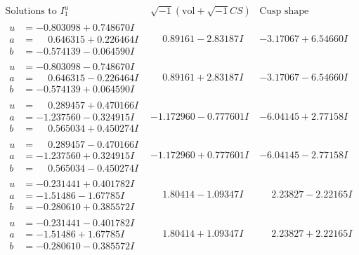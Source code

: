 \documentclass[1p]{elsarticle_modified}
\theoremstyle{definition}
\newcommand{\I}{\sqrt{-1}}
\begin{document}
$$\begin{array}{c|c|c}  
\text{Solutions to }I^u_{1}& \I (\text{vol} + \sqrt{-1}CS) & \text{Cusp shape}\\
 \hline 
\begin{aligned}
u &= -0.803098 + 0.748670 I \\
a &= \phantom{-}0.646315 + 0.226464 I \\
b &= -0.574139 - 0.064590 I\end{aligned}
 & \phantom{-}0.89161 - 2.83187 I & -3.17067 + 6.54660 I \\ \hline\begin{aligned}
u &= -0.803098 - 0.748670 I \\
a &= \phantom{-}0.646315 - 0.226464 I \\
b &= -0.574139 + 0.064590 I\end{aligned}
 & \phantom{-}0.89161 + 2.83187 I & -3.17067 - 6.54660 I \\ \hline\begin{aligned}
u &= \phantom{-}0.289457 + 0.470166 I \\
a &= -1.237560 - 0.324915 I \\
b &= \phantom{-}0.565034 + 0.450274 I\end{aligned}
 & -1.172960 - 0.777601 I & -6.04145 + 2.77158 I \\ \hline\begin{aligned}
u &= \phantom{-}0.289457 - 0.470166 I \\
a &= -1.237560 + 0.324915 I \\
b &= \phantom{-}0.565034 - 0.450274 I\end{aligned}
 & -1.172960 + 0.777601 I & -6.04145 - 2.77158 I \\ \hline\begin{aligned}
u &= -0.231441 + 0.401782 I \\
a &= -1.51486 - 1.67785 I \\
b &= -0.280610 + 0.385572 I\end{aligned}
 & \phantom{-}1.80414 - 1.09347 I & \phantom{-}2.23827 - 2.22165 I \\ \hline\begin{aligned}
u &= -0.231441 - 0.401782 I \\
a &= -1.51486 + 1.67785 I \\
b &= -0.280610 - 0.385572 I\end{aligned}
 & \phantom{-}1.80414 + 1.09347 I & \phantom{-}2.23827 + 2.22165 I \\ \hline\begin{aligned}

\end{aligned}
\end{array}$$
\end{document}
